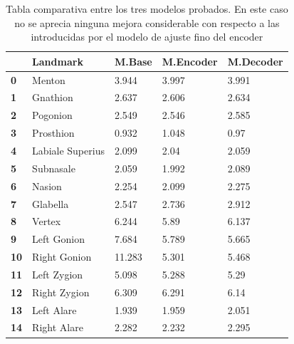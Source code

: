         \begin{table}[!ht]
            \centering
            \caption{Tabla comparativa entre los tres modelos probados. En este caso no se aprecia ninguna mejora considerable con respecto a las introducidas por el modelo de ajuste fino del encoder}
            \begin{tabular}{|l|l|l|l|l|}
            \hline
                \textbf{} & \cellcolor{gray!25}\textbf{Landmark} & \cellcolor{gray!25}\textbf{M.Base} & \cellcolor{gray!25}\textbf{M.Encoder} & \cellcolor{gray!25}\textbf{M.Decoder} \\ \hline
                \textbf{0} & Menton & 3.944 & 3.997 & \cellcolor{green!25} 3.991 \\ \hline
                \textbf{1} & Gnathion & 2.637 & \cellcolor{green!25} 2.606 & 2.634 \\ \hline
                \textbf{2} & Pogonion & 2.549 & \cellcolor{green!25} 2.546 & 2.585 \\ \hline
                \textbf{3} & Prosthion & \cellcolor{green!25} 0.932 & 1.048 & 0.97 \\ \hline
                \textbf{4} & Labiale Superius & 2.099 & \cellcolor{green!25} 2.04 & 2.059 \\ \hline
                \textbf{5} & Subnasale & 2.059 & \cellcolor{green!25} 1.992 & 2.089 \\ \hline
                \textbf{6} & Nasion & 2.254 & \cellcolor{green!25} 2.099 & 2.275 \\ \hline
                \textbf{7} & Glabella & \cellcolor{green!25} 2.547 & 2.736 & 2.912 \\ \hline
                \textbf{8} & Vertex & 6.244 & \cellcolor{green!25} 5.89 & 6.137 \\ \hline
                \textbf{9} & Left Gonion & 7.684 & 5.789 & \cellcolor{green!25} 5.665 \\ \hline
                \textbf{10} & Right Gonion & 11.283 & \cellcolor{green!25} 5.301 & 5.468 \\ \hline
                \textbf{11} & Left Zygion & \cellcolor{green!25} 5.098 & 5.288 & 5.29 \\ \hline
                \textbf{12} & Right Zygion & 6.309 & 6.291 & \cellcolor{green!25} 6.14 \\ \hline
                \textbf{13} & Left Alare & \cellcolor{green!25} 1.939 & 1.959 & 2.051 \\ \hline
                \textbf{14} & Right Alare & 2.282 & \cellcolor{green!25} 2.232 & 2.295 \\ \hline

\end{tabular}
\end{table}
